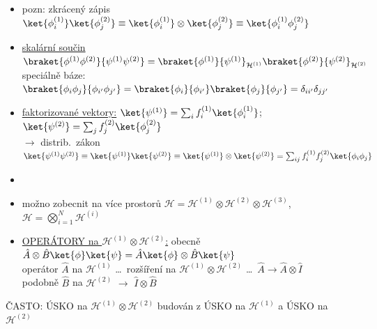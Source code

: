 \documentclass[11pt,a4paper]{article}
\begin{document}
\begin{itemize}
  \item pozn: zkrácený zápis \quad $\ket{\phi_i^{(1)}}\ket{\phi_j^{(2)}} \equiv \ket{\phi_i^{(1)}}\otimes\ket{\phi_j^{(2)}} \equiv \ket{\phi_i^{(1)}\phi_j^{(2)}}$
  \item \underline{skalární součin} \quad
        $\braket{\phi^{(1)}\phi^{(2)}}{\psi^{(1)}\psi^{(2)}} = \braket{\phi^{(1)}}{\psi^{(1)}}_{\mathcal{H}^{(1)}}\braket{\phi^{(2)}}{\psi^{(2)}}_{\mathcal{H}^{(2)}}$ \\
        speciálně báze: \quad $\braket{\phi_i\phi_j}{\phi_{i'}\phi_{j'}} = \braket{\phi_i}{\phi_{i'}}\braket{\phi_j}{\phi_{j'}} = \delta_{ii'}\delta_{jj'}$
  \item \underline{faktorizované vektory:} \quad
        $\ket{\psi^{(1)}} = \sum_i f_i^{(1)}\ket{\phi_i^{(1)}}$; \quad $\ket{\psi^{(2)}} = \sum_j f_j^{(2)}\ket{\phi_j^{(2)}}$ \\
        $\to$ distrib.\ zákon \quad
        $\ket{\psi^{(1)}\psi^{(2)}} \equiv \ket{\psi^{(1)}}\ket{\psi^{(2)}} \equiv \ket{\psi^{(1)}}\otimes\ket{\psi^{(2)}} = \sum_{ij}f_i^{(1)}f_j^{(2)}\ket{\phi_i\phi_j}$
  \item {} 
  \item možno zobecnit na více prostorů \quad
        $\mathcal{H} = \mathcal{H}^{(1)}\otimes\mathcal{H}^{(2)}\otimes\mathcal{H}^{(3)}$, \quad
        $\mathcal{H} = \bigotimes_{i=1}^{N}\mathcal{H}^{(i)}$
  \item \underline{OPERÁTORY na $\mathcal{H}^{(1)}\otimes\mathcal{H}^{(2)}$:} \quad
        obecně \quad $\hat A\otimes\hat B\ket{\phi}\ket{\psi} = \hat A\ket{\phi}\otimes\hat B\ket{\psi}$ \\
        operátor $\hat A$ na $\mathcal{H}^{(1)}$ \dots\ rozšíření na $\mathcal{H}^{(1)}\otimes\mathcal{H}^{(2)}$ \dots\ $\hat A\to\hat A\otimes\hat I$ \\
        podobně $\hat B$ na $\mathcal{H}^{(2)}$ $\to$ $\hat I\otimes\hat B$
\end{itemize}
ČASTO: ÚSKO na $\mathcal{H}^{(1)}\otimes\mathcal{H}^{(2)}$ budován z ÚSKO na $\mathcal{H}^{(1)}$ a ÚSKO na $\mathcal{H}^{(2)}$

\end{document}
